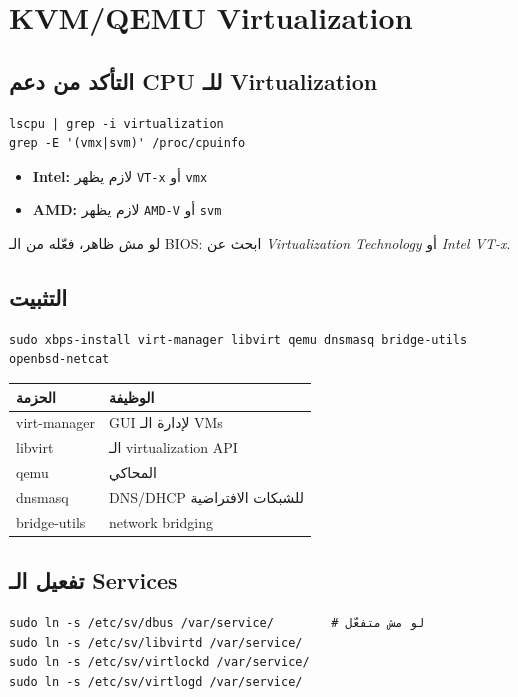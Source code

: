 \documentclass[12pt, a4paper]{report}
\begin{document}
\chapter{KVM/QEMU Virtualization}

\section{التأكد من دعم CPU للـ Virtualization}
\begin{lstlisting}
lscpu | grep -i virtualization
grep -E '(vmx|svm)' /proc/cpuinfo
\end{lstlisting}

\begin{itemize}[leftmargin=*]
  \item \textbf{Intel:} لازم يظهر \texttt{VT-x} أو \texttt{vmx}
  \item \textbf{AMD:} لازم يظهر \texttt{AMD-V} أو \texttt{svm}
\end{itemize}

لو مش ظاهر، فعّله من الـ BIOS: ابحث عن \textit{Virtualization Technology} أو \textit{Intel VT-x}.

\section{التثبيت}
\begin{lstlisting}
sudo xbps-install virt-manager libvirt qemu dnsmasq bridge-utils openbsd-netcat
\end{lstlisting}

\begin{center}
\begin{tabularx}{0.85\textwidth}{>{\ttfamily\color{accent}}l X}
\toprule
\rowcolor{tabhead}\color{white}الحزمة & \color{white}الوظيفة \\
\midrule
virt-manager  & GUI لإدارة الـ VMs \\
libvirt       & الـ virtualization API \\
qemu          & المحاكي \\
dnsmasq       & DNS/DHCP للشبكات الافتراضية \\
bridge-utils  & network bridging \\
\bottomrule
\end{tabularx}
\end{center}

\section{تفعيل الـ Services}
\begin{lstlisting}
sudo ln -s /etc/sv/dbus /var/service/        # لو مش متفعّل
sudo ln -s /etc/sv/libvirtd /var/service/
sudo ln -s /etc/sv/virtlockd /var/service/
sudo ln -s /etc/sv/virtlogd /var/service/
\end{lstlisting}
\end{document}
